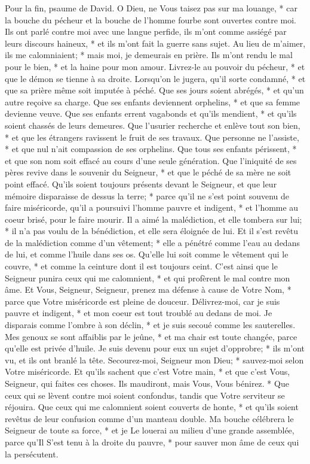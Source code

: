 Pour la fin, psaume de David.
O Dieu, ne Vous taisez pas sur ma louange, * car la bouche du pécheur et la bouche de l'homme fourbe sont ouvertes contre moi.
Ils ont parlé contre moi avec une langue perfide, ils m'ont comme assiégé par leurs discours haineux, * et ils m'ont fait la guerre sans sujet.
Au lieu de m'aimer, ils me calomniaient; * mais moi, je demeurais en prière.
Ils m'ont rendu le mal pour le bien, * et la haine pour mon amour.
Livrez-le au pouvoir du pécheur, * et que le démon se tienne à sa droite.
Lorsqu'on le jugera, qu'il sorte condamné, * et que sa prière même soit imputée à péché.
Que ses jours soient abrégés, * et qu'un autre reçoive sa charge.
Que ses enfants deviennent orphelins, * et que sa femme devienne veuve.
Que ses enfants errent vagabonds et qu'ils mendient, * et qu'ils soient chassés de leurs demeures.
Que l'usurier recherche et enlève tout son bien, * et que les étrangers ravissent le fruit de ses travaux.
Que personne ne l'assiste, * et que nul n'ait compassion de ses orphelins.
Que tous ses enfants périssent, * et que son nom soit effacé au cours d'une seule génération.
Que l'iniquité de ses pères revive dans le souvenir du Seigneur, * et que le péché de sa mère ne soit point effacé.
Qu'ils soient toujours présents devant le Seigneur, et que leur mémoire disparaisse de dessus la terre; *
parce qu'il ne s'est point souvenu de faire miséricorde,
qu'il a poursuivi l'homme pauvre et indigent, * et l'homme au coeur brisé, pour le faire mourir.
Il a aimé la malédiction, et elle tombera sur lui; * il n'a pas voulu de la bénédiction, et elle sera éloignée de lui. Et il s'est revêtu de la malédiction comme d'un vêtement; * elle a pénétré comme l'eau au dedans de lui, et comme l'huile dans ses os.
Qu'elle lui soit comme le vêtement qui le couvre, * et comme la ceinture dont il est toujours ceint.
C'est ainsi que le Seigneur punira ceux qui me calomnient, * et qui profèrent le mal contre mon âme.
Et Vous, Seigneur, Seigneur, prenez ma défense à cause de Votre Nom, * parce que Votre miséricorde est pleine de douceur. Délivrez-moi,
car je suis pauvre et indigent, * et mon coeur est tout troublé au dedans de moi.
Je disparais comme l'ombre à son déclin, * et je suis secoué comme les sauterelles.
Mes genoux se sont affaiblis par le jeûne, * et ma chair est toute changée, parce qu'elle est privée d'huile.
Je suis devenu pour eux un sujet d'opprobre; * ils m'ont vu, et ils ont branlé la tête.
Secourez-moi, Seigneur mon Dieu; * sauvez-moi selon Votre miséricorde.
Et qu'ils sachent que c'est Votre main, * et que c'est Vous, Seigneur, qui faites ces choses.
Ils maudiront, mais Vous, Vous bénirez. * Que ceux qui se lèvent contre moi soient confondus, tandis que Votre serviteur se réjouira.
Que ceux qui me calomnient soient couverts de honte, * et qu'ils soient revêtus de leur confusion comme d'un manteau double.
Ma bouche célébrera le Seigneur de toute sa force, * et je Le louerai au milieu d'une grande assemblée,
parce qu'Il S'est tenu à la droite du pauvre, * pour sauver mon âme de ceux qui la persécutent.

